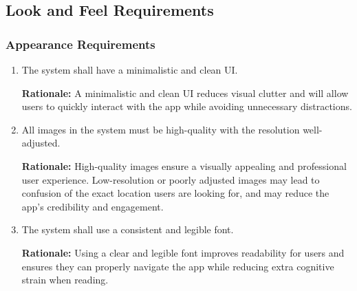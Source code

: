 \documentclass[]{article}
\begin{document}
\subsection{Look and Feel Requirements}
\label{sub:look_and_feel_requirements}

\subsubsection{Appearance Requirements}
\label{ssub:appearance_requirements}
\begin{enumerate}[{LF-A}1. ]
	\item The system shall have a minimalistic and clean UI.
	
	{\bf Rationale:} A minimalistic and clean UI reduces visual clutter and will allow users to quickly interact with the app while avoiding unnecessary distractions.
	\item All images in the system must be high-quality with the resolution well-adjusted.
	
	{\bf Rationale:} High-quality images ensure a visually appealing and professional user experience. Low-resolution or poorly adjusted images may lead to confusion of the exact location users are looking for, and may reduce the app's credibility and engagement.
	\item The system shall use a consistent and legible font.
	
	{\bf Rationale:} Using a clear and legible font improves readability for users and ensures they can properly navigate the app while reducing extra cognitive strain when reading.
\end{enumerate}
\end{document}
